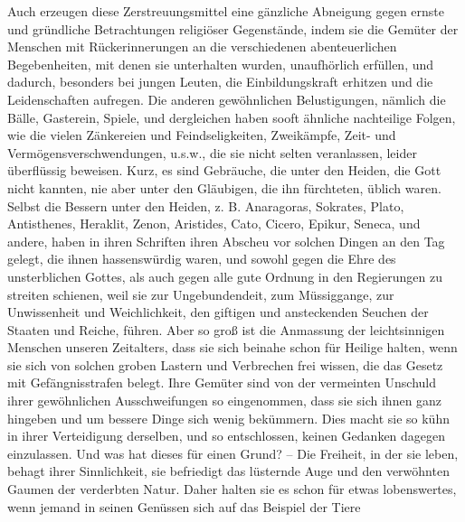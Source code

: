 Auch erzeugen diese Zerstreuungsmittel eine gänzliche Abneigung gegen ernste und
gründliche Betrachtungen religiöser Gegenstände, indem sie die Gemüter der
Menschen mit Rückerinnerungen an die verschiedenen abenteuerlichen
Begebenheiten, mit denen sie unterhalten wurden, unaufhörlich erfüllen, und
dadurch, besonders bei jungen Leuten, die Einbildungskraft 
erhitzen und die
Leidenschaften aufregen. Die anderen gewöhnlichen Belustigungen, nämlich die
Bälle, Gasterein, Spiele, und dergleichen haben sooft ähnliche nachteilige Folgen, wie
die vielen Zänkereien und Feindseligkeiten, Zweikämpfe, Zeit- und
Vermögensverschwendungen, u.s.w., die sie nicht selten veranlassen, leider
überflüssig beweisen. Kurz, es sind Gebräuche, die unter den Heiden, die Gott
nicht kannten, nie aber unter den Gläubigen, die ihn fürchteten, üblich waren.
Selbst die Bessern unter den Heiden, z. B. Anaragoras, Sokrates, Plato,
Antisthenes, Heraklit, 
Zenon, Aristides, Cato, 
Cicero, Epikur, Seneca, und
andere, haben in ihren Schriften ihren Abscheu vor solchen Dingen an den Tag
gelegt, die ihnen hassenswürdig waren, und sowohl gegen die Ehre des
unsterblichen Gottes, als auch gegen alle gute Ordnung in den Regierungen zu
streiten schienen, weil sie zur Ungebundendeit, zum Müssiggange, zur Unwissenheit
und Weichlichkeit, den giftigen und ansteckenden Seuchen der Staaten und 
Reiche,
führen. Aber so groß ist die Anmassung der leichtsinnigen Menschen unseren
Zeitalters, dass sie sich beinahe schon für Heilige halten, wenn sie sich von
solchen groben Lastern und Verbrechen frei wissen, die das Gesetz mit
Gefängnisstrafen belegt. Ihre Gemüter sind von der vermeinten Unschuld ihrer
gewöhnlichen Ausschweifungen so eingenommen, dass sie sich ihnen ganz hingeben
und um bessere Dinge sich wenig bekümmern. Dies macht sie so kühn in ihrer
Verteidigung derselben, und so entschlossen, keinen Gedanken dagegen
einzulassen. Und was hat dieses für einen Grund? -- Die Freiheit, in der sie
leben, behagt ihrer Sinnlichkeit, sie befriedigt das lüsternde Auge und den
verwöhnten Gaumen der verderbten Natur. Daher halten sie es schon für etwas
lobenswertes, wenn jemand in seinen Genüssen sich auf das Beispiel der Tiere
